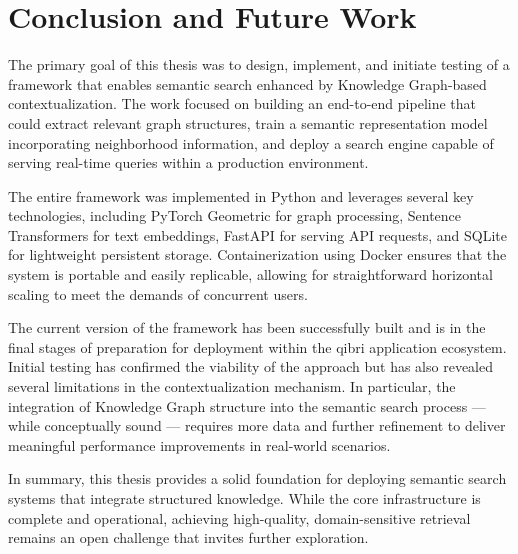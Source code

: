 \documentclass[draft,final]{vutinfth} %
\begin{document}
\chapter{Conclusion and Future Work} \label{chap:conclusion}
The primary goal of this thesis was to design, implement, and initiate testing of a framework that enables semantic search enhanced by Knowledge Graph-based contextualization. The work focused on building an end-to-end pipeline that could extract relevant graph structures, train a semantic representation model incorporating neighborhood information, and deploy a search engine capable of serving real-time queries within a production environment.

The entire framework was implemented in Python and leverages several key technologies, including PyTorch Geometric for graph processing, Sentence Transformers for text embeddings, FastAPI for serving API requests, and SQLite for lightweight persistent storage. Containerization using Docker ensures that the system is portable and easily replicable, allowing for straightforward horizontal scaling to meet the demands of concurrent users.

The current version of the framework has been successfully built and is in the final stages of preparation for deployment within the qibri application ecosystem. Initial testing has confirmed the viability of the approach but has also revealed several limitations in the contextualization mechanism. In particular, the integration of Knowledge Graph structure into the semantic search process — while conceptually sound — requires more data and further refinement to deliver meaningful performance improvements in real-world scenarios.

In summary, this thesis provides a solid foundation for deploying semantic search systems that integrate structured knowledge. While the core infrastructure is complete and operational, achieving high-quality, domain-sensitive retrieval remains an open challenge that invites further exploration.
\end{document}

